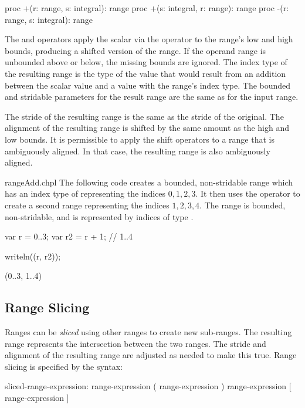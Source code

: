 \begin{chapel}
proc +(r: range, s: integral): range
proc +(s: integral, r: range): range
proc -(r: range, s: integral): range
\end{chapel}

The \chpl{+} and \chpl{-} operators apply the scalar via the operator
to the range's low and high bounds, producing a shifted version of the
range.  If the operand range is unbounded above or below, the missing bounds
are ignored.
The index type of the resulting range is the type of the value
that would result from an addition between the scalar value and a value
with the range's index type.  The bounded and stridable parameters for
the result range are the same as for the input range.

The stride of the resulting range is the same as the stride of the
original. The alignment of the resulting range is shifted by the same amount as
the high and low bounds.  It is permissible to apply the shift operators to a
range that is ambiguously aligned.  In that case, the resulting range is also
ambiguously aligned.

\begin{chapelexample}{rangeAdd.chpl}
The following code creates a bounded, non-stridable range 
which has an index type of  representing the indices ${0, 1, 2, 3}$.  
It then uses the \chpl{+} operator to create a second range 
representing the indices ${1, 2, 3, 4}$.  The  range is bounded,
non-stridable, and is represented by indices of type .
\begin{chapel}
var r = 0..3;
var r2 = r + 1;    // 1..4
\end{chapel}
\begin{chapelpost}
writeln((r, r2));
\end{chapelpost}
\begin{chapeloutput}
(0..3, 1..4)
\end{chapeloutput}
\end{chapelexample}


\subsection{Range Slicing}
\label{Range_Slicing}

Ranges can be \emph{sliced} using other ranges to create new
sub-ranges.  The resulting range represents the intersection between
the two ranges.  The stride and alignment of the resulting range are adjusted as
needed to make this true.  Range slicing is specified by the syntax:
\begin{syntax}
sliced-range-expression:
  range-expression ( range-expression )
  range-expression [ range-expression ]
\end{syntax}

